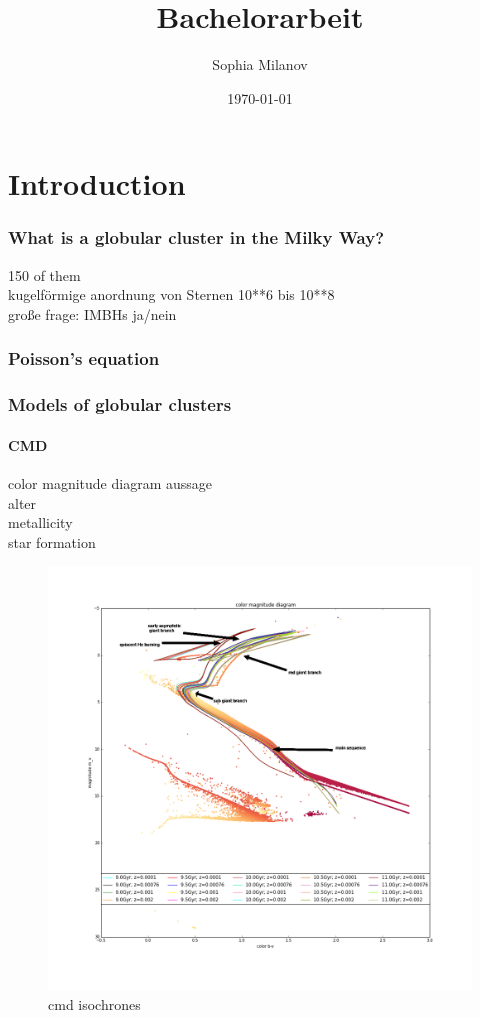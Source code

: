 \documentclass[a4paper,12pt,abstracton]{scrartcl}
\title{Bachelorarbeit}
\author{Sophia Milanov}
\date{\today}
\begin{document}


\begin{abstract}
\Blindtext 
\end{abstract}

\newpage

\tableofcontents

\newpage
\part{Introduction}
\section{What is a globular cluster in the Milky Way?}
150 of them \\
kugelförmige anordnung von Sternen 10**6 bis 10**8\\
große frage: IMBHs ja/nein
\section{Poisson's equation}
\section{Models of globular clusters}
\subsection{CMD}
color magnitude diagram aussage\\
alter\\
metallicity\\
star formation\\
\begin{figure}[htbp] 
	\includegraphics[width=\textwidth]{./Plots/color_magnitude_diagram_with_iscochrones.png}
	\caption{cmd isochrones}
	\label{fig:Abbildung1} 
\end{figure}
\end{document}
